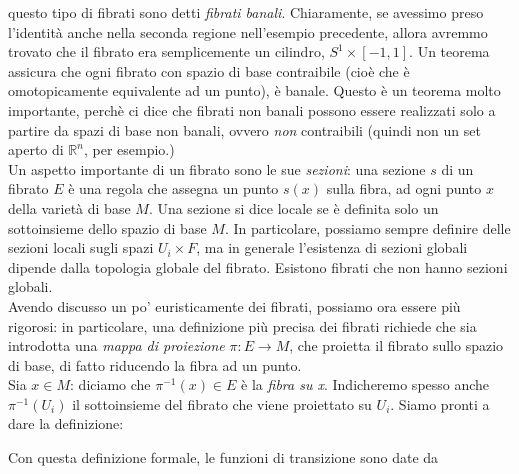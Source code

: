 \documentclass{report}
\begin{document}
questo tipo di fibrati sono detti \emph{fibrati banali}. Chiaramente, se avessimo preso l'identità anche nella seconda regione nell'esempio precedente, allora avremmo trovato che il fibrato era semplicemente un cilindro, \(S^1 \times [-1, 1]\). Un teorema assicura che ogni fibrato con spazio di base contraibile (cioè che è omotopicamente equivalente ad un punto), è banale. Questo è un teorema molto importante, perchè ci dice che fibrati non banali possono essere realizzati solo a partire da spazi di base non banali, ovvero \emph{non} contraibili (quindi non un set aperto di \(\mathbb{R}^n\), per esempio.) \\

Un aspetto importante di un fibrato sono le sue \emph{sezioni}: una sezione \(s\) di un fibrato \(E\) è una regola che assegna un punto \(s(x)\) sulla fibra, ad ogni punto \(x\) della varietà di base \(M\). Una sezione si dice locale se è definita solo un sottoinsieme dello spazio di base \(M\). In particolare, possiamo sempre definire delle sezioni locali sugli spazi \(U_i \times F\), ma in generale l'esistenza di sezioni globali dipende dalla topologia globale del fibrato. Esistono fibrati che non hanno sezioni globali. \\

Avendo discusso un po' euristicamente dei fibrati, possiamo ora essere più rigorosi: in particolare, una definizione più precisa dei fibrati richiede che sia introdotta una \emph{mappa di proiezione} \(\pi: E \rightarrow M\), che proietta il fibrato sullo spazio di base, di fatto riducendo la fibra ad un punto. \\

Sia \(x \in M\): diciamo che \(\pi^{-1}(x) \in E\) è la \emph{fibra su x}. Indicheremo spesso anche \(\pi^{-1}(U_i)\) il sottoinsieme del fibrato che viene proiettato su \(U_i\). Siamo pronti a dare la definizione: 



Con questa definizione formale, le funzioni di transizione sono date da
\end{document}
